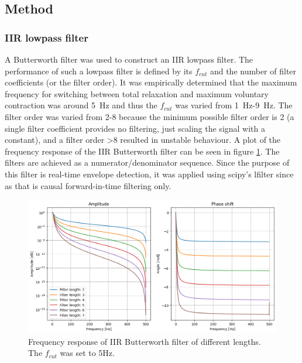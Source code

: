 \subsection{Method}
\subsubsection{IIR lowpass filter}
A Butterworth filter was used to construct an IIR lowpass filter. The performance of such a lowpass filter is defined by its $f_{cut}$ and the number of filter coefficients (or the filter order). It was empirically determined that the maximum frequency for switching between total relaxation and maximum voluntary contraction was around \SI{5}{\hertz} and thus the $f_{cut}$ was varied from \SI{1}{\hertz}-\SI{9}{\hertz}. The filter order was varied from 2-8 because the minimum possible filter order is 2 (a single filter coefficient provides no filtering, just scaling the signal with a constant), and a filter order >8 resulted in unstable behaviour. A plot of the frequency response of the IIR Butterworth filter can be seen in figure \ref{fig:iir_frequencyresponse_coefficients}. The filters are achieved as a numerator/denominator sequence. Since the purpose of this filter is real-time envelope detection, it was applied using scipy's lfilter since as that is causal forward-in-time filtering only.


\begin{figure}[h!t]
	\begin{center}
		\includegraphics[width=1.0\columnwidth]{images/iir_frequencyresponse_coefficients.png}
	\end{center}
	\caption{Frequency response of IIR Butterworth filter of different lengths. The $f_{cut}$ was set to 5Hz.}
	\label{fig:iir_frequencyresponse_coefficients}
\end{figure}


